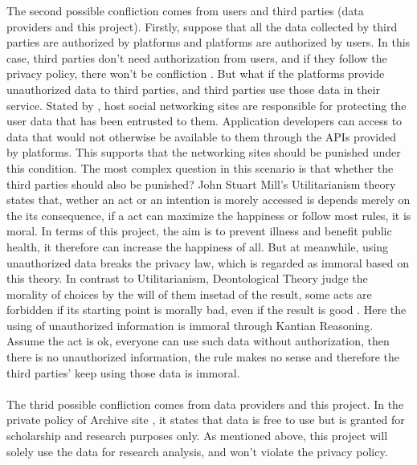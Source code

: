 The second possible confliction comes from users and third parties (data providers and this project). Firstly, suppose that all the data collected by third parties are authorized by platforms and platforms are authorized by users. In this case, third parties don't need authorization from users, and if they follow the privacy policy, there won't be confliction \cite{tankard2012big}. But what if the platforms provide unauthorized data to third parties, and third parties use those data in their service. Stated by \cite{felt2008privacy}, host social networking sites are responsible for protecting the user data that has been entrusted to them. Application developers can access to data that would not otherwise be available to them through
the APIs provided by platforms. This supports that the networking sites should be punished under this condition. The most complex question in this scenario is that whether the third parties should also be punished? John Stuart Mill's Utilitarianism theory \cite{mill2016utilitarianism} states that, wether an act or an intention is morely accessed is depends merely on the its consequence, if a act can maximize the happiness or follow most rules, it is moral. In terms of this project, the aim is to prevent illness and benefit public health, it therefore can increase the happiness of all. But at meanwhile, using unauthorized data breaks the privacy law, which is regarded as immoral based on this theory. In contrast to Utilitarianism, Deontological Theory judge the morality of choices by the will of them insetad of the result, some acts are forbidden if its starting point is morally bad, even if the result is good \cite{alexander2007deontological}. Here the using of unauthorized information is immoral through Kantian Reasoning. Assume the act is ok, everyone can use such data without authorization, then there is no unauthorized information, the rule makes no sense and therefore the third parties' keep using those data is immoral. \\\\
The thrid possible confliction comes from data providers and this project. In the private policy of Archive site \cite{archive_pri}, it states that data is free to use but is granted for scholarship and research purposes only. As mentioned above, this project will solely use the data for research analysis, and won't violate the privacy policy.

